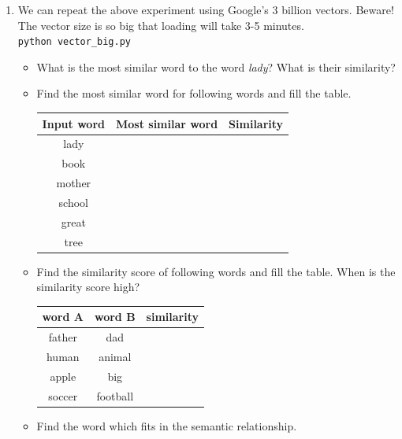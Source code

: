\documentclass[12pt,fleqn]{article}
\begin{document}
\begin{enumerate}
\item We can repeat the above experiment using Google's 3 billion vectors. Beware! The vector size is so big that loading will take 3-5 minutes.\\ 

\texttt{python vector\_big.py} \\ 

\begin{itemize} 
 \item What is the most similar word to the word \textit{lady}? What is their similarity? 
 \item Find the most similar word for following words and fill the table. 
 \begin{table}[htb!] 
  \begin{center} 
     \begin{tabular}{c|c|c}
      Input word & Most similar word & Similarity \\  \hline 
      lady & & \\ 
      book & & \\ 
      mother & & \\ 
      school & & \\ 
      great & & \\ 
      tree & & \\ 
     \end{tabular}
  \end{center}
\end{table}
\item Find the similarity score of following words and fill the table. When is the similarity score high? 
\begin{table}[htb!] 
   \begin{center} 
         \begin{tabular}{c|c|c}
          word A & word B & similarity \\  \hline 
          father & dad &  \\ 
          human & animal &  \\ 
          apple & big & \\ 
          soccer & football & \\ 
         \end{tabular}
   \end{center}
\end{table}

\item Find the word which fits in the semantic relationship.


\end{itemize}
\end{enumerate}
\end{document}

